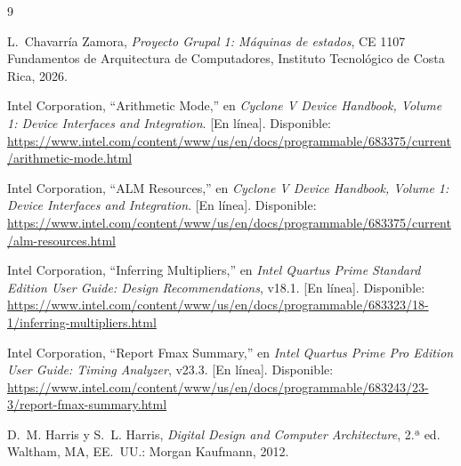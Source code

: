 \documentclass[11pt,letterpaper]{article}
\begin{document}
\begin{thebibliography}{9}

L.~Chavarría Zamora, \emph{Proyecto Grupal 1: Máquinas de estados}, CE 1107 Fundamentos de
Arquitectura de Computadores, Instituto Tecnológico de Costa Rica, 2026.

Intel Corporation, ``Arithmetic Mode,'' en \emph{Cyclone V Device Handbook, Volume 1: Device
Interfaces and Integration}. [En línea]. Disponible:
\url{https://www.intel.com/content/www/us/en/docs/programmable/683375/current/arithmetic-mode.html}

Intel Corporation, ``ALM Resources,'' en \emph{Cyclone V Device Handbook, Volume 1: Device
Interfaces and Integration}. [En línea]. Disponible:
\url{https://www.intel.com/content/www/us/en/docs/programmable/683375/current/alm-resources.html}

Intel Corporation, ``Inferring Multipliers,'' en \emph{Intel Quartus Prime Standard Edition User
Guide: Design Recommendations}, v18.1. [En línea]. Disponible:
\url{https://www.intel.com/content/www/us/en/docs/programmable/683323/18-1/inferring-multipliers.html}

Intel Corporation, ``Report Fmax Summary,'' en \emph{Intel Quartus Prime Pro Edition User Guide:
Timing Analyzer}, v23.3. [En línea]. Disponible:
\url{https://www.intel.com/content/www/us/en/docs/programmable/683243/23-3/report-fmax-summary.html}

D.~M. Harris y S.~L. Harris, \emph{Digital Design and Computer Architecture}, 2.ª ed.
Waltham, MA, EE.~UU.: Morgan Kaufmann, 2012.

\end{thebibliography}
\end{document}
